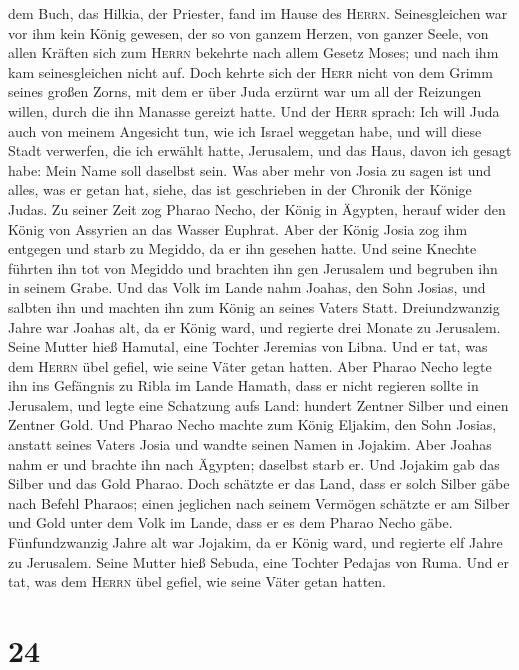 dem Buch, das Hilkia, der Priester, fand im Hause des \textsc{Herrn}.
 Seinesgleichen war vor ihm kein König gewesen, der so
von ganzem Herzen, von ganzer Seele, von allen Kräften sich zum
\textsc{Herrn} bekehrte nach allem Gesetz Moses; und nach ihm kam
seinesgleichen nicht auf.  Doch kehrte sich der
\textsc{Herr} nicht von dem Grimm seines großen Zorns, mit dem er über
Juda erzürnt war um all der Reizungen willen, durch die ihn Manasse
gereizt hatte.  Und der \textsc{Herr} sprach: Ich will
Juda auch von meinem Angesicht tun, wie ich Israel weggetan habe, und
will diese Stadt verwerfen, die ich erwählt hatte, Jerusalem, und das
Haus, davon ich gesagt habe: Mein Name soll daselbst sein.
 Was aber mehr von Josia zu sagen ist und alles, was er
getan hat, siehe, das ist geschrieben in der Chronik der Könige Judas.
 Zu seiner Zeit zog Pharao Necho, der König in Ägypten,
herauf wider den König von Assyrien an das Wasser Euphrat. Aber der
König Josia zog ihm entgegen und starb zu Megiddo, da er ihn gesehen
hatte.  Und seine Knechte führten ihn tot von Megiddo und
brachten ihn gen Jerusalem und begruben ihn in seinem Grabe. Und das
Volk im Lande nahm Joahas, den Sohn Josias, und salbten ihn und machten
ihn zum König an seines Vaters Statt.  Dreiundzwanzig
Jahre war Joahas alt, da er König ward, und regierte drei Monate zu
Jerusalem. Seine Mutter hieß Hamutal, eine Tochter Jeremias von Libna.
 Und er tat, was dem \textsc{Herrn} übel gefiel, wie
seine Väter getan hatten.  Aber Pharao Necho legte ihn
ins Gefängnis zu Ribla im Lande Hamath, dass er nicht regieren sollte in
Jerusalem, und legte eine Schatzung aufs Land: hundert Zentner Silber
und einen Zentner Gold.  Und Pharao Necho machte zum
König Eljakim, den Sohn Josias, anstatt seines Vaters Josia und wandte
seinen Namen in Jojakim. Aber Joahas nahm er und brachte ihn nach
Ägypten; daselbst starb er.  Und Jojakim gab das Silber
und das Gold Pharao. Doch schätzte er das Land, dass er solch Silber
gäbe nach Befehl Pharaos; einen jeglichen nach seinem Vermögen schätzte
er am Silber und Gold unter dem Volk im Lande, dass er es dem Pharao
Necho gäbe.  Fünfundzwanzig Jahre alt war Jojakim, da er
König ward, und regierte elf Jahre zu Jerusalem. Seine Mutter hieß
Sebuda, eine Tochter Pedajas von Ruma.  Und er tat, was
dem \textsc{Herrn} übel gefiel, wie seine Väter getan hatten.

\hypertarget{section-23}{%
\section{24}\label{section-23}}

